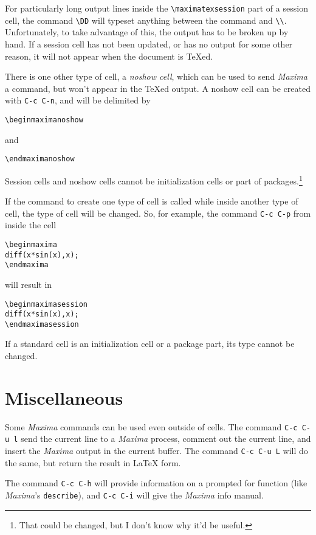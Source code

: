 \documentclass{article}
\newcommand{\mx}{\textsl{\sffamily Maxima}}
\begin{document}
For particularly long output lines inside the \verb+\maximatexsession+
part of a session cell, the command \verb+\DD+ will typeset anything
between the command and \verb+\\+.  Unfortunately, to take advantage
of this, the output has to be broken up by hand.
If a session cell has not been updated, or has no output for some
other reason, it will not appear when the document is \TeX{}ed.

There is one other type of cell, a \emph{noshow cell}, which can be
used to send \mx{} a command, but won't appear in the \TeX{}ed
output. A noshow cell can be created with \texttt{C-c C-n}, and will
be delimited by
\begin{verbatim}
\beginmaximanoshow
\end{verbatim}
\noindent
and
\begin{verbatim}
\endmaximanoshow
\end{verbatim}

Session cells and noshow cells cannot be initialization cells or part of
packages.\footnote{That could be changed, but I don't know why it'd be
useful.} 

If the command to create one type of cell is called while inside
another type of cell, the type of cell will be changed.  So, for
example, the command \texttt{C-c C-p} from inside the cell
\begin{verbatim}
\beginmaxima
diff(x*sin(x),x);
\endmaxima
\end{verbatim}
\noindent
will result in
\begin{verbatim}
\beginmaximasession
diff(x*sin(x),x);
\endmaximasession
\end{verbatim}
\noindent
If a standard cell is an initialization cell or a package part, its
type cannot be changed.


\section{Miscellaneous}

\noindent
Some \mx{} commands can be used even outside of cells.  The command 
\texttt{C-c C-u l} send the current line to a
\mx{} process, comment out the current line, and insert the \mx{}
output in the current buffer.  The command 
\texttt{C-c C-u L} will do the same, but
return the result in \LaTeX{} form.

The command \texttt{C-c C-h} will provide
information on a prompted for function (like \mx's \texttt{describe}), 
and  \texttt{C-c C-i} will give the \mx{} info manual.
\end{document}
